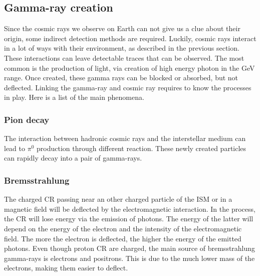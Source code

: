 \subsection{Gamma-ray creation}

Since the cosmic rays we observe on Earth can not give us a clue about their origin, some indirect detection methods are required. Luckily, cosmic rays interact in a lot of ways with their environment, as described in the previous section. These interactions can leave detectable traces that can be observed. The most common is the production of light, via creation of high energy photon in the GeV range. Once created, these gamma rays can be blocked or absorbed, but not deflected. Linking the gamma-ray and cosmic ray requires to know the processes in play. Here is a list of the main phenomena.

\subsubsection{Pion decay}


The interaction between hadronic cosmic rays and the interstellar medium can lead to $\pi^0$ production through different reaction. These newly created  particles can rapidly decay into a pair of gamma-rays.



\subsubsection{Bremsstrahlung}


The charged CR passing near an other charged particle of the ISM or in a magnetic field will be deflected by the electromagnetic interaction. In the process, the CR will lose energy via the emission of photons. The energy of the latter will depend on the energy of the electron and the intensity of the electromagnetic field. The more the electron is deflected, the higher the energy of the emitted photons.
Even though proton CR are charged, the main source of bremsstrahlung gamma-rays is electrons and positrons. This is due to the much lower mass of the electrons, making them easier to deflect.

